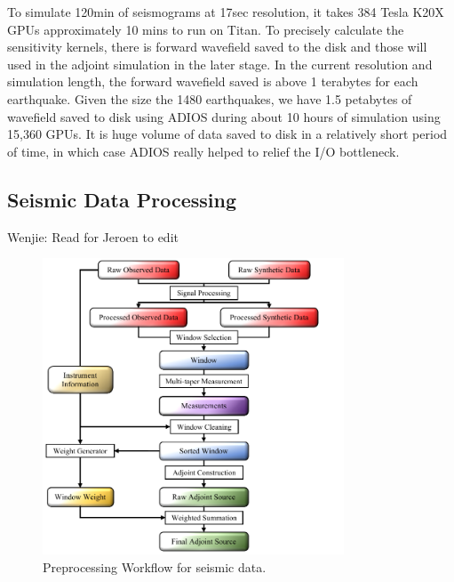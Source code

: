 \documentclass[extra,mreferee]{gji}
\begin{document}
To simulate 120min of seismograms at 17sec resolution, it takes 384 Tesla K20X
GPUs approximately 10 mins to run on Titan. To precisely calculate the sensitivity
kernels, there is forward wavefield saved to the disk and those will used in the
adjoint simulation in the later stage. In the current resolution
and simulation length, the forward wavefield saved is above 1 terabytes
for each earthquake. Given the size the 1480 earthquakes, we have 1.5 petabytes of
wavefield saved to disk using ADIOS\citep{liu2014hello} during about 10 hours
of simulation using 15,360 GPUs.
It is huge volume of data saved to disk in a relatively short period of time, in which case
ADIOS really helped to relief the I/O bottleneck.

\subsection{Seismic Data Processing}

{\color{Red} Wenjie: Read for Jeroen to edit}

\begin{figure}
  \centering
  \includegraphics[width=0.8\textwidth]{figures/Preprocess_workflow.pdf}
  \caption{Preprocessing Workflow for seismic data.}
  \label{fig:preprocess_workflow}
\end{figure}
\end{document}
